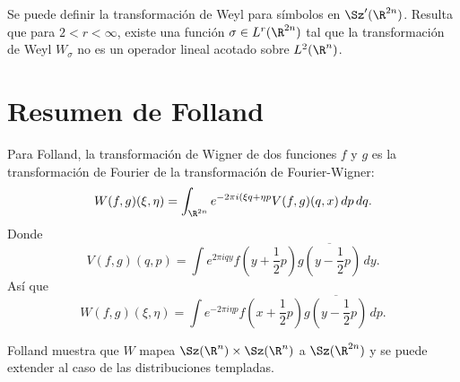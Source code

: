   Se puede definir la transformación de Weyl para símbolos
  en $\Sz'(\R^{2n})$. Resulta que para $2 < r < \infty$,
  existe una función $\sigma \in L^{r}(\R^{2n})$ tal que la
  transformación de Weyl $W_\sigma$ no es un operador lineal
  acotado sobre $L^2(\R^{n})$.

  \section{Resumen de Folland}

  Para Folland, la transformación de Wigner de dos funciones
  $f$ y $g$ es la transformación de Fourier de la
  transformación de Fourier-Wigner:
  \[
    W(f,g)(\xi, \eta)
    = \int_{\R^{2n}} e^{-2\pi i (\xi q + \eta p} V(f,g)(q,x)
    \, dp \, dq.
  \] 
  Donde
  \[
    V(f,g)(q,p)
    = \int e^{2\pi i q y} f(y + \frac{1}{2}p)\overline{g(y -
    \frac{1}{2}p)} \, dy.
  \] 
  Así que
  \[
    W(f,g)(\xi, \eta) = \int e^{-2\pi i \eta p }
    f(x+\frac{1}{2}p)\overline{g(y-\frac{1}{2}p)} \, dp.
  \] 

  Folland muestra que $W$ mapea $\Sz(\R^{n}) \times
  \Sz(\R^{n})$ a $\Sz(\R^{2n})$ y se puede extender al caso
  de las distribuciones templadas.
